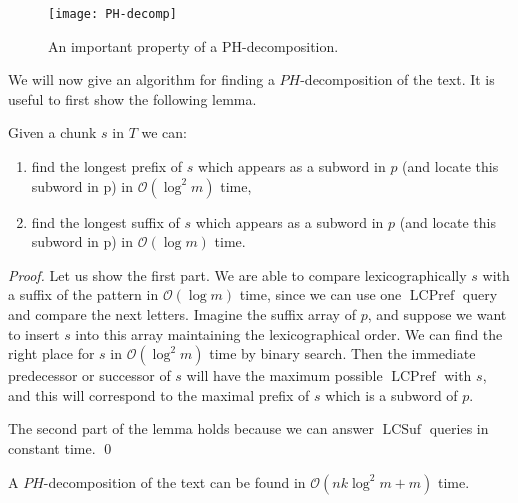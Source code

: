 \documentclass[runningheads]{llncs}
\DeclareMathOperator{\LCPref}{LCPref}
\DeclareMathOperator{\LCSuf}{LCSuf}
\begin{document}
\begin{figure}[t]
\texttt{[image: PH-decomp]}
\caption{An important property of a PH-decomposition.}
\label{figure:PH-decomp}
\end{figure}

We will now give an algorithm for finding a $PH$-decomposition of the text. It is useful to first show the following lemma.

\begin{lemma}\label{lemma:longfactor}
Given a chunk $s$ in $T$ we can:
\begin{enumerate}
\item{find the longest prefix of $s$ which appears as a subword in $p$ (and locate this subword in p) in $\mathcal{O}(\log^2 m)$} time,
\item{find the longest suffix of $s$ which appears as a subword in $p$ (and locate this subword in p) in $\mathcal{O}(\log m)$} time.
\end{enumerate}
\end{lemma}

\begin{proof}
Let us show the first part. We are able to compare lexicographically $s$ with a suffix of the pattern in $\mathcal{O}(\log m)$ time, since we can use one $\LCPref$ query and compare the next letters. Imagine the suffix array of $p$, and suppose we want to insert $s$ into this array maintaining the lexicographical order. We can find the right place for $s$ in $\mathcal{O}(\log^2 m)$ time by binary search. Then the immediate predecessor or successor of $s$ will have the maximum possible $\LCPref$ with $s$, and this will correspond to the maximal prefix of $s$ which is a subword of $p$. 

The second part of the lemma holds because we can answer $\LCSuf$ queries in constant time.
\qed
\end{proof}

\begin{lemma}
A $PH$-decomposition of the text can be found in $\mathcal{O}(nk\log^2m+m)$ time.
\end{lemma}
\end{document}

